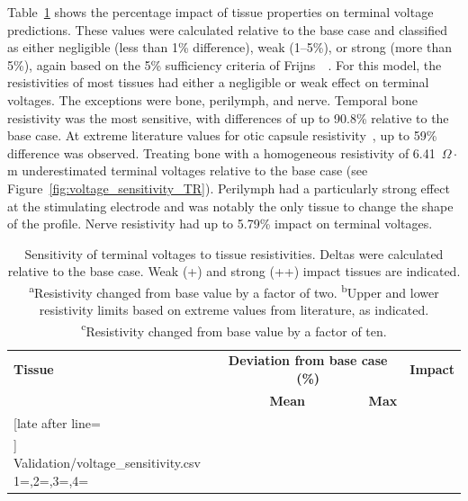 Table~\ref{table:voltage_sensitivity} shows the percentage impact of tissue
properties on terminal voltage predictions. These values were calculated
relative to the base case and classified as either negligible (less than 1\%
difference), weak (1--5\%), or strong (more than 5\%), again based on the 5\%
sufficiency criteria of Frijns~\etal~\cite{frijns1995}. For this model, the
resistivities of most tissues had either a negligible or weak effect on terminal
voltages. The exceptions were bone, perilymph, and nerve. Temporal bone
resistivity was the most sensitive, with differences of up to 90.8\% relative to
the base case. At extreme literature values for otic capsule
resistivity~\cite{haueisen1997,williams1996}, up to 59\% difference was
observed. Treating bone with a homogeneous resistivity of 6.41~$ \Omega \cdot$m
underestimated terminal voltages relative to the base case (see
Figure~\ref{fig:voltage_sensitivity_TR}). Perilymph had a particularly strong
effect at the stimulating electrode and was notably the only tissue to change
the shape of the profile. Nerve resistivity had up to 5.79\% impact on terminal
voltages.

\begin{table}
	\centering
	\sffamily
	\small
	\caption[Sensitivity of terminal voltages to tissue resistivities]{Sensitivity
	of terminal voltages to tissue resistivities. Deltas were calculated relative
	to the base case. Weak (+) and strong (++) impact tissues are indicated.
		{\textsuperscript{a}}Resistivity changed from base value by a factor of two.
		{\textsuperscript{b}}Upper and lower resistivity limits based on extreme
		values from literature, as indicated.
		{\textsuperscript{c}}Resistivity changed from base value by a factor of ten.
	}
	\label{table:voltage_sensitivity}
	
	\begin{tabularx}{0.85\textwidth}{X c c c}
		\toprule
		\textbf{Tissue}	& \multicolumn{2}{c}{\textbf{Deviation from base case (\%)}}
			& \textbf{Impact} \\
						& \textbf{~~~~~~~Mean~~~~~~~} & \textbf{Max}
			& \\
		\midrule
		
		\csvreader[late after line=\\]%
			{Validation/voltage_sensitivity.csv}%
			{1=\tissue,2=\mean,3=\max,4=\strength}%
 			{\tissue & \mean & \max & \strength}%
		\bottomrule
	\end{tabularx}
	
\end{table}

